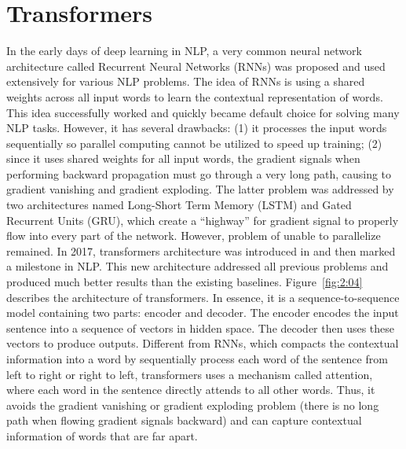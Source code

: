 \documentclass[12pt, sort&compress]{report}
\begin{document}
\section{Transformers}
\label{2.3}
In the early days of deep learning in NLP, a very common neural network architecture called Recurrent Neural Networks (RNNs) was proposed and used extensively for various NLP problems. The idea of RNNs is using a shared weights across all input words to learn the contextual representation of words. This idea successfully worked and quickly became default choice for solving many NLP tasks. However, it has several drawbacks: (1) it processes the input words sequentially so parallel computing cannot be utilized to speed up training; (2) since it uses shared weights for all input words, the gradient signals when performing backward propagation must go through a very long path, causing to gradient vanishing and gradient exploding. The latter problem was addressed by two architectures named Long-Short Term Memory (LSTM) and Gated Recurrent Units (GRU), which create a “highway” for gradient signal to properly flow into every part of the network. However, problem of unable to parallelize remained. In 2017, transformers architecture was introduced in \cite{vaswani2017attention} and then marked a milestone in NLP. This new architecture addressed all previous problems and produced much better results than the existing baselines. Figure~\ref{fig:2:04} describes the architecture of transformers. In essence, it is a sequence-to-sequence model containing two parts: encoder and decoder. The encoder encodes the input sentence into a sequence of vectors in hidden space. The decoder then uses these vectors to produce outputs. Different from RNNs, which compacts the contextual information into a word by sequentially process each word of the sentence from left to right or right to left, transformers uses a mechanism called attention, where each word in the sentence directly attends to all other words. Thus, it avoids the gradient vanishing or gradient exploding problem (there is no long path when flowing gradient signals backward) and can capture contextual information of words that are far apart.
\end{document}
